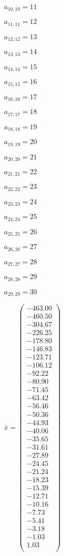 \documentclass[a4paper,12pt]{article}
\begin{document}
$a _{ 10, 10 } = 11$

$a _{ 11, 11 } = 12$

$a _{ 12, 12 } = 13$

$a _{ 13, 13 } = 14$

$a _{ 14, 14 } = 15$

$a _{ 15, 15 } = 16$

$a _{ 16, 16 } = 17$

$a _{ 17, 17 } = 18$

$a _{ 18, 18 } = 19$

$a _{ 19, 19 } = 20$

$a _{ 20, 20 } = 21$

$a _{ 21, 21 } = 22$

$a _{ 22, 22 } = 23$

$a _{ 23, 23 } = 24$

$a _{ 24, 24 } = 25$

$a _{ 25, 25 } = 26$

$a _{ 26, 26 } = 27$

$a _{ 27, 27 } = 28$

$a _{ 28, 28 } = 29$

$a _{ 29, 29 } = 30$

$\bar { x } = \begin{pmatrix}
-463.00 \\
-460.50 \\
-304.67 \\
-226.25 \\
-178.80 \\
-146.83 \\
-123.71 \\
-106.12 \\
-92.22 \\
-80.90 \\
-71.45 \\
-63.42 \\
-56.46 \\
-50.36 \\
-44.93 \\
-40.06 \\
-35.65 \\
-31.61 \\
-27.89 \\
-24.45 \\
-21.24 \\
-18.23 \\
-15.39 \\
-12.71 \\
-10.16 \\
-7.73 \\
-5.41 \\
-3.18 \\
-1.03 \\
1.03 \\
\end{pmatrix}
$
\end{document}
